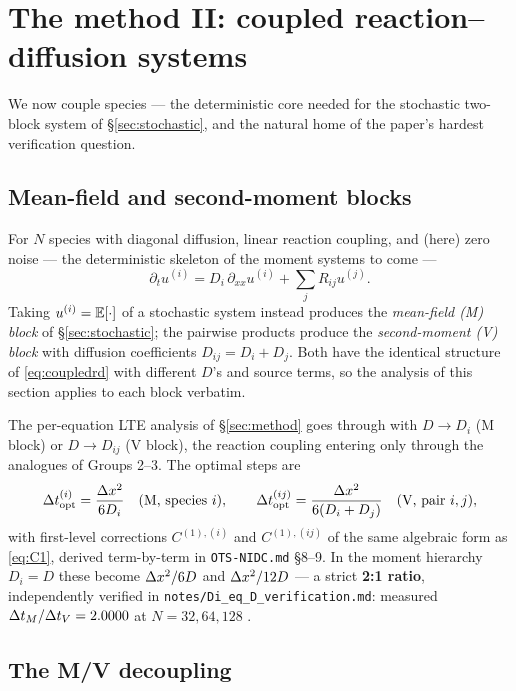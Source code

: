 \section{The method II: coupled reaction--diffusion systems}\label{sec:coupled}

We now couple species --- the deterministic core needed for the stochastic
two-block system of \S\ref{sec:stochastic}, and the natural home of the paper's
hardest verification question.

\subsection{Mean-field and second-moment blocks}

For $N$ species with diagonal diffusion, linear reaction coupling, and (here)
zero noise --- the deterministic skeleton of the moment systems to come ---
\begin{equation}\label{eq:coupledrd}
\partial_t u^{(i)} = D_i\,\partial_{xx}u^{(i)} + \sum_j R_{ij}u^{(j)}.
\end{equation}
Taking $u^{(i)}=\mathbb{E}[\cdot]$ of a stochastic system instead produces the
\emph{mean-field (M) block} of \S\ref{sec:stochastic}; the pairwise products
produce the \emph{second-moment (V) block} with diffusion coefficients
$D_{ij}=D_i+D_j$. Both have the identical structure of \eqref{eq:coupledrd}
with different $D$'s and source terms, so the analysis of this section applies
to each block verbatim.

The per-equation LTE analysis of \S\ref{sec:method} goes through with
$D\to D_i$ (M block) or $D\to D_{ij}$ (V block), the reaction coupling entering
only through the analogues of Groups 2--3. The optimal steps are
\begin{equation}\label{eq:coupledopt}
\Delta t_{\mathrm{opt}}^{(i)} = \frac{\Delta x^2}{6D_i} \quad(\text{M, species }i),
\qquad
\Delta t_{\mathrm{opt}}^{(ij)} = \frac{\Delta x^2}{6(D_i+D_j)} \quad(\text{V, pair }i,j),
\end{equation}
with first-level corrections $C^{(1),(i)}$ and $C^{(1),(ij)}$ of the same
algebraic form as \eqref{eq:C1}, derived term-by-term in \texttt{OTS-NIDC.md}
\S8--9. In the moment hierarchy $D_i = D$ these become $\Delta x^2/6D$ and
$\Delta x^2/12D$ --- a strict \textbf{2:1 ratio}, independently verified in
\texttt{notes/Di\_eq\_D\_verification.md}: measured $\Delta t_M/\Delta t_V = 2.0000$ at
$N=32,64,128$ \tagV.

\subsection{The M/V decoupling}

